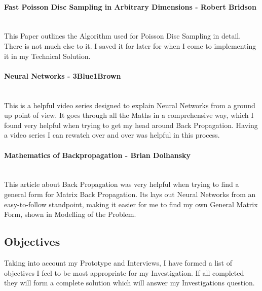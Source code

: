 \begin{flushleft}
                \paragraph*{Fast Poisson Disc Sampling in Arbitrary Dimensions - Robert Bridson} \mbox{} \\
                    This Paper outlines the Algorithm used for Poisson Disc Sampling in detail. There is not much else to it. I saved it for later
                    for when I come to implementing it in my Technical Solution.

                \paragraph*{Neural Networks - 3Blue1Brown} \mbox{} \\
                    This is a helpful video series designed to explain Neural Networks from a ground up point of view. It goes through all the Maths
                    in a comprehensive way, which I found very helpful when trying to get my head around Back Propagation. Having a video series I
                    can rewatch over and over was helpful in this process.

                \paragraph*{Mathematics of Backpropagation - Brian Dolhansky} \mbox{} \\
                    This article about Back Propagation was very helpful when trying to find a general form for Matrix Back Propagation. Its lays
                    out Neural Networks from an easy-to-follow standpoint, making it easier for me to find my own General Matrix Form, shown in
                    Modelling of the Problem. 
        \subsection{Objectives}
            \large
            Taking into account my Prototype and Interviews, I have formed a list of objectives I feel to be most 
            appropriate for my Investigation. If all completed they will form a complete solution which will answer 
            my Investigations question.\\

            \renewcommand{\labelenumii}{\arabic{enumi}.\arabic{enumii}}
            \renewcommand{\labelenumiii}{\arabic{enumi}.\arabic{enumii}.\arabic{enumiii}}
            \renewcommand{\labelenumiv}{\arabic{enumi}.\arabic{enumii}.\arabic{enumiii}.\arabic{enumiv}}


\end{flushleft}
